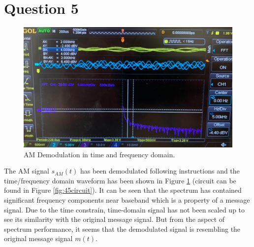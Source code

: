 \documentclass[11pt]{article}
\begin{document}
\section*{Question 5}
\begin{figure}[H]
    \centering
    \includegraphics[scale = 0.6]{Q5.PNG}
    \caption{\label{fig:q5}AM Demodulation in time and frequency domain.}
\end{figure}
The AM signal $s_{AM}(t)$ has been demodulated following instructions and the time/frequency domain waveform has been shown in Figure \ref{fig:q5} (circuit can be found in Figure \ref{fig:45circuit}). It can be seen that the spectrum has contained significant frequency components near baseband which is a property of a message signal. Due to the time constrain, time-domain signal has not been scaled up to see its similarity with the original message signal. But from the aspect of spectrum performance, it seems that the demodulated signal is resembling the original message signal $m(t)$. 

\newpage
\end{document}
